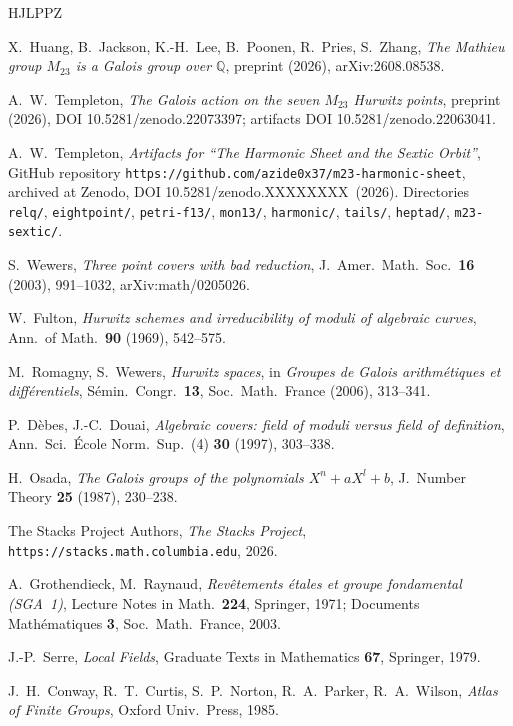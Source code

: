 \documentclass[11pt]{amsart}
\newcommand{\artifactsdoi}{10.5281/zenodo.XXXXXXXX}   %
\theoremstyle{plain}
\theoremstyle{definition}
\begin{document}
\begin{thebibliography}{HJLPPZ}

X.~Huang, B.~Jackson, K.-H.~Lee, B.~Poonen, R.~Pries, S.~Zhang,
\emph{The Mathieu group $M_{23}$ is a Galois group over $\mathbb Q$},
preprint (2026), arXiv:2608.08538.

A.~W.~Templeton, \emph{The Galois action on the seven $M_{23}$
Hurwitz points}, preprint (2026), DOI 10.5281/zenodo.22073397;
artifacts DOI 10.5281/zenodo.22063041.

A.~W.~Templeton, \emph{Artifacts for ``The Harmonic Sheet and the
Sextic Orbit''}, GitHub repository
\texttt{https://github.com/azide0x37/m23-harmonic-sheet}, archived at
Zenodo, DOI \artifactsdoi\ (2026). Directories \texttt{relq/},
\texttt{eightpoint/}, \texttt{petri-f13/}, \texttt{mon13/},
\texttt{harmonic/}, \texttt{tails/}, \texttt{heptad/},
\texttt{m23-sextic/}.

S.~Wewers, \emph{Three point covers with bad reduction},
J.~Amer.~Math.~Soc.\ \textbf{16} (2003), 991--1032,
arXiv:math/0205026.

W.~Fulton, \emph{Hurwitz schemes and irreducibility of moduli of
algebraic curves}, Ann.\ of Math.\ \textbf{90} (1969), 542--575.

M.~Romagny, S.~Wewers, \emph{Hurwitz spaces}, in \emph{Groupes de
Galois arithm\'etiques et diff\'erentiels}, S\'emin.\ Congr.\
\textbf{13}, Soc.\ Math.\ France (2006), 313--341.

P.~D\`ebes, J.-C.~Douai, \emph{Algebraic covers: field of moduli
versus field of definition}, Ann.\ Sci.\ \'Ecole Norm.\ Sup.\ (4)
\textbf{30} (1997), 303--338.

H.~Osada, \emph{The Galois groups of the polynomials $X^n+aX^l+b$},
J.~Number Theory \textbf{25} (1987), 230--238.

The Stacks Project Authors, \emph{The Stacks Project},
\texttt{https://stacks.math.columbia.edu}, 2026.

A.~Grothendieck, M.~Raynaud, \emph{Rev\^etements \'etales et groupe
fondamental (SGA~1)}, Lecture Notes in Math.\ \textbf{224}, Springer,
1971; Documents Math\'ematiques \textbf{3}, Soc.\ Math.\ France, 2003.

J.-P.~Serre, \emph{Local Fields}, Graduate Texts in Mathematics
\textbf{67}, Springer, 1979.

J.~H.~Conway, R.~T.~Curtis, S.~P.~Norton, R.~A.~Parker,
R.~A.~Wilson, \emph{Atlas of Finite Groups}, Oxford Univ.\ Press,
1985.

\end{thebibliography}
\end{document}
